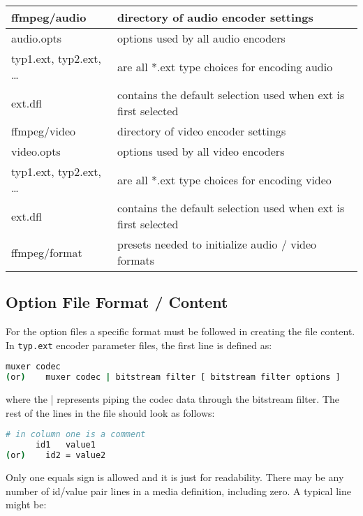 \begin{center}
    \begin{longtable}{l p{23em}}
        \toprule
        ffmpeg/audio & directory of audio encoder settings \\
        \midrule
        audio.opts & options used by all audio encoders \\
        typ1.ext, typ2.ext, … & are all *.ext type choices for encoding audio \\
        ext.dfl & contains the default selection used when ext is first selected \\
        \midrule
        ffmpeg/video & directory of video encoder settings \\
        \midrule
        video.opts & options used by all video encoders \\
        typ1.ext, typ2.ext, … & are all *.ext type choices for encoding video \\
        ext.dfl & contains the default selection used when ext is first selected \\
        \midrule
        ffmpeg/format & presets needed to initialize audio / video formats \\
        \bottomrule
    \end{longtable}
\end{center}

\subsection{Option File Format / Content}%
\label{sub:option_file_format_content}

For the option files a specific format must be followed in creating the file content.
In \texttt{typ.ext} encoder parameter files, the first line is defined as:

\begin{lstlisting}[language=bash,numbers=none]
      muxer codec
(or) 	muxer codec | bitstream filter [ bitstream filter options ]
\end{lstlisting}

where the | represents piping the codec data through the bitstream filter. The rest of the lines in the file should look as follows:

\begin{lstlisting}[language=bash,numbers=none]
      # in column one is a comment
      id1   value1
(or)	id2 = value2
\end{lstlisting}

Only one equals sign is allowed and it is just for readability.  There may be any number of id/value pair lines in a media definition, including zero. A typical line might be:

